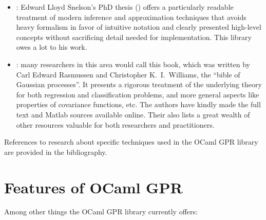 \documentclass[10pt]{report}
\begin{document}
\begin{itemize}

\item
\emph{}: Edward
Lloyd Snelson's PhD thesis (\cite{SnelsonThesis}) offers a particularly
readable treatment of modern inference and approximation techniques
that avoids heavy formalism in favor of intuitive notation and
clearly presented high-level concepts without sacrificing detail
needed for implementation.  This library owes a lot to his work.

\item \emph{}: many researchers in this area
would call this book, which was written by Carl Edward Rasmussen
and Christopher K.\ I.\  Williams, the ``bible of Gaussian processes''.
It presents a rigorous treatment of the underlying theory for both
regression and classification problems, and more general aspects
like properties of covariance functions, etc.  The authors have
kindly made the full text and Matlab sources available online.
Their  also lists a great wealth of other resources valuable for
both researchers and practitioners.

\end{itemize}

References to research about specific techniques used in the OCaml
GPR library are provided in the bibliography.

\section{Features of OCaml GPR}

Among other things the OCaml GPR library currently offers:
\end{document}
